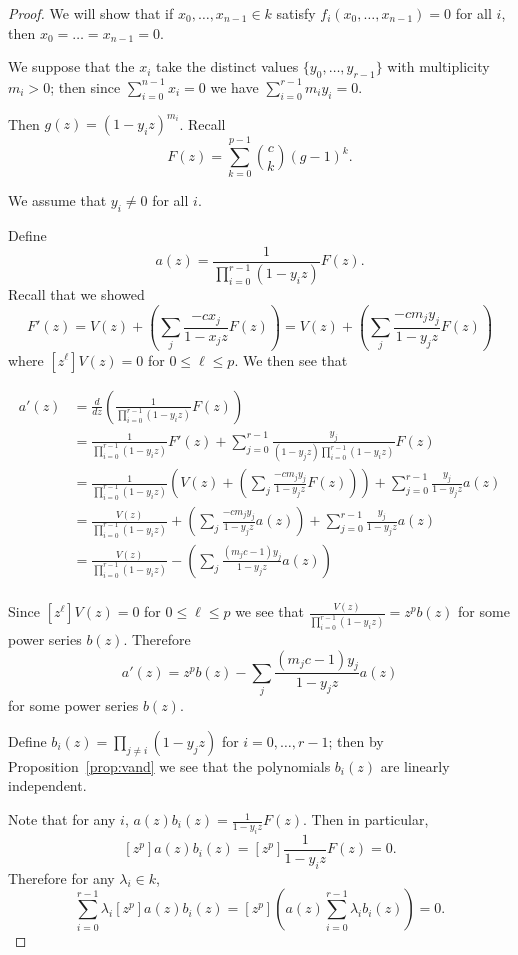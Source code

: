 \documentclass{article}
\numberwithin{equation}{section}
\begin{document}
\begin{proof} 

We will show that if $x_0,\dots,x_{n-1} \in k$ satisfy $f_i(x_0,\dots,x_{n-1})=0$ for all $i$, then $x_0=\dots=x_{n-1}=0$. 



We suppose that the $x_i$ take the distinct values $\{y_0,\dots,y_{r-1}\}$ with multiplicity $m_i>0$; then since $\sum_{i=0}^{n-1} x_i=0$ we have $\sum_{i=0}^{r-1} m_iy_i=0$. 

Then $g(z)=(1-y_iz)^{m_i}$. Recall $$F(z)=\sum_{k=0}^{p-1} \binom{c}{k}(g-1)^k.$$

We assume that $y_i \ne 0$ for all $i$.

Define $$a(z)=\frac{1}{\prod_{i=0}^{r-1}(1-y_iz)}F(z).$$ Recall that we showed $$F'(z)=V(z)+\left(\sum_j \frac{-cx_j}{1-x_jz}F(z)\right)=V(z)+\left(\sum_j \frac{-cm_jy_j}{1-y_jz}F(z)\right)$$ where $[z^\ell]V(z)=0$ for $0 \le \ell \le p$. We then see that

\begin{align*}
a'(z)&=\frac{d}{dz}\left(\frac{1}{\prod_{i=0}^{r-1}(1-y_iz)}F(z)\right)\\
&=\frac{1}{\prod_{i=0}^{r-1}(1-y_iz)}F'(z)+\sum_{j=0}^{r-1}\frac{y_j}{(1-y_jz)\prod_{i=0}^{r-1}(1-y_iz)}F(z)\\
&=\frac{1}{\prod_{i=0}^{r-1}(1-y_iz)}\left(V(z)+\left(\sum_j \frac{-cm_jy_j}{1-y_jz}F(z)\right)\right)+\sum_{j=0}^{r-1}\frac{y_j}{1-y_jz}a(z)\\
&=\frac{V(z)}{\prod_{i=0}^{r-1}(1-y_iz)}+\left(\sum_j \frac{-cm_jy_j}{1-y_jz}a(z)\right)+\sum_{j=0}^{r-1}\frac{y_j}{1-y_jz}a(z)\\
&=\frac{V(z)}{\prod_{i=0}^{r-1}(1-y_iz)}-\left(\sum_j \frac{(m_jc-1)y_j}{1-y_jz}a(z)\right)\\\end{align*}

Since $[z^\ell]V(z)=0$ for $0 \le \ell \le p$ we see that $\frac{V(z)}{\prod_{i=0}^{r-1}(1-y_iz)}=z^pb(z)$ for some power series $b(z)$. Therefore $$a'(z)=z^pb(z)-\sum_j \frac{(m_jc-1)y_j}{1-y_jz}a(z)$$ for some power series $b(z)$.

Define $b_i(z)=\prod_{j \ne i} (1-y_jz)$ for $i=0,\dots,r-1$; then by Proposition~\ref{prop:vand} we see that the polynomials $b_i(z)$ are linearly independent. 

Note that for any $i$, $a(z)b_i(z)=\frac{1}{1-y_iz}F(z)$. Then in particular, $$[z^p]a(z)b_i(z)=[z^p]\frac{1}{1-y_iz}F(z)=0.$$ Therefore for any $\lambda_i \in k$, \begin{equation}\label{eq:lincomb}\sum_{i=0}^{r-1} \lambda_i[z^p]a(z)b_i(z)=[z^p]\left( a(z)\sum_{i=0}^{r-1}\lambda_ib_i(z)\right)=0.\end{equation}


\end{proof}
\end{document}
